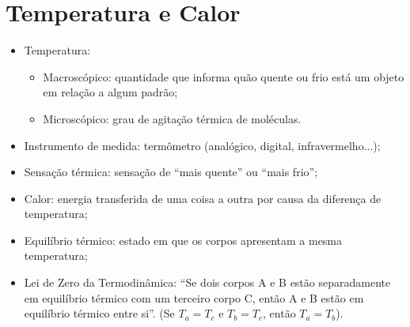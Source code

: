 \documentclass[12pt]{article}
\author{J. R. Oliveira}
\date{\today}
\title{\content}
\newcommand{\aspas}[1]{``#1''}
\newcommand*\includeQuestion[1]{%
\XSIMexpandcode{\printexercise{exercise}{\GetExerciseIdForProperty{ID}{#1}}}%
}
\newcommand*\includeSolution[1]{%
\XSIMexpandcode{\printsolution{exercise}{\GetExerciseIdForProperty{ID}{#1}}}%
}
\begin{document}
\onehalfspacing

\maketitle
\newpage
\tableofcontents
\newpage





\section{Temperatura e Calor}
\begin{itemize}
    \item Temperatura:
    \begin{itemize}
            \item Macroscópico: quantidade que informa quão quente ou frio está um objeto em relação a algum padrão;
            \item Microscópico: grau de agitação térmica de moléculas.
    \end{itemize}
    \item Instrumento de medida: termômetro (analógico, digital, infravermelho...);
    \item Sensação térmica: sensação de \aspas{mais quente} ou \aspas{mais frio};
    \item Calor: energia transferida de uma coisa a outra por causa da diferença de temperatura;
    \item Equilíbrio térmico: estado em que os corpos apresentam a mesma temperatura; 
    \item Lei de Zero da Termodinâmica: \aspas{Se dois corpos A e B estão separadamente em equilíbrio térmico com um terceiro corpo C, então A e B estão em equilíbrio térmico entre si}. (Se $T_{a}=T_{c}$ e $T_{b}=T_{c}$, então $T_{a}=T_{b}$). 
\end{itemize}
\end{document}
